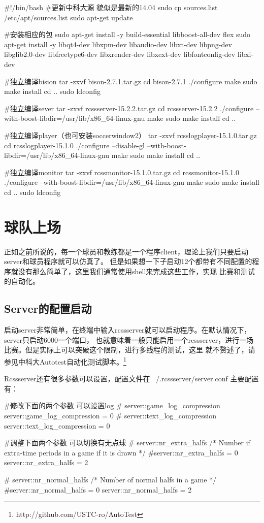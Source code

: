 \begin{Codex}[label=install.sh]
#!/bin/bash
#更新中科大源 貌似是最新的14.04
sudo cp sources.list /etc/apt/sources.list
sudo apt-get update

#安装相应的包
sudo apt-get install -y build-essential libboost-all-dev flex 
sudo apt-get install -y libqt4-dev libxpm-dev libaudio-dev libxt-dev
 libpng-dev libglib2.0-dev libfreetype6-dev libxrender-dev libxext-dev
  libfontconfig-dev libxi-dev

#独立编译bision
tar -zxvf bison-2.7.1.tar.gz
cd bison-2.7.1
./configure
make
sudo make install
cd ..
sudo ldconfig

#独立编译sever
tar -zxvf rcssserver-15.2.2.tar.gz
cd rcssserver-15.2.2 
./configure --with-boost-libdir=/usr/lib/x86_64-linux-gnu
make
sudo make install
cd ..

#独立编译player（也可安装soccerwindow2）
tar -zxvf rcsslogplayer-15.1.0.tar.gz
cd rcsslogplayer-15.1.0
./configure --disable-gl --with-boost-libdir=/usr/lib/x86_64-linux-gnu
make
sudo make install
cd ..

#独立编译monitor
tar -zxvf rcssmonitor-15.1.0.tar.gz
cd rcssmonitor-15.1.0 
./configure --with-boost-libdir=/usr/lib/x86_64-linux-gnu
make
sudo make install
cd ..
sudo ldconfig
\end{Codex}
\section{球队上场}
正如之前所说的，每一个球员和教练都是一个程序client，理论上我们只要启动server和球员程序就可以仿真了。
但是如果想一下子启动12个都带有不同配置的程序就没有那么简单了，这里我们通常使用shell来完成这些工作，实现
比赛和测试的自动化。

\subsection{Server的配置启动}
启动server非常简单，在终端中输入rcssserver就可以启动程序。在默认情况下，server只启动6000一个端口，
也就意味着一般只能启用一个rcssserver，进行一场比赛。但是实际上可以突破这个限制，进行多线程的测试，这里
就不赘述了，请参见中科大Autotest自动化测试脚本。\footnote{http://github.com/USTC-ro/AutoTest}

Rcssserver还有很多参数可以设置，配置文件在 ~/.rcssserver/server.conf 
主要配置有：
\begin{Codex}[label=server.conf]
#修改下面的两个参数 可以设置log
# server::game_log_compression
server::game_log_compression = 0
# server::text_log_compression
server::text_log_compression = 0

#调整下面两个参数 可以切换有无点球 
# server::nr_extra_halfs  
/* Number if extra-time periods in a game if it is drawn */
#server::nr_extra_halfs = 0
server::nr_extra_halfs = 2

# server::nr_normal_halfs
/* Number of normal halfs in a game */
#server::nr_normal_halfs = 0
server::nr_normal_halfs = 2
\end{Codex}

